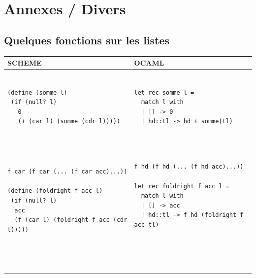 \documentclass[11pt]{book}
\begin{document}
\chapter{Annexes / Divers}
\section{Quelques fonctions sur les listes}
 
\begin{footnotesize}
\begin{tabular}{l|l} \hline
SCHEME & OCAML \\ \hline
\begin{minipage}{2.8in}
\begin{Verbatim}

(define (somme l)
 (if (null? l)
   0
   (+ (car l) (somme (cdr l)))))
   
\end{Verbatim}
\end{minipage}
&
\begin{minipage}{2.8in}
\begin{Verbatim}

let rec somme l =
  match l with
  | [] -> 0
  | hd::tl -> hd + somme(tl)  
  
\end{Verbatim} 
\end{minipage} \\ \hline
\begin{minipage}{2.8in}

\begin{Verbatim}

f car (f car (... (f car acc)...))

(define (foldright f acc l)
 (if (null? l)
  acc
  (f (car l) (foldright f acc (cdr l)))))
\end{Verbatim}
\end{minipage}
&
\begin{minipage}{2.8in}

\begin{Verbatim}

f hd (f hd (... (f hd acc)...))

let rec foldright f acc l =
  match l with
  | [] -> acc
  | hd::tl -> f hd (foldright f acc tl)
  
\end{Verbatim}
\end{minipage} \\ \hline
\begin{minipage}{2.8in}
\begin{Verbatim}


\end{Verbatim}
\end{minipage}
\end{tabular}
\end{footnotesize}
\end{document}
